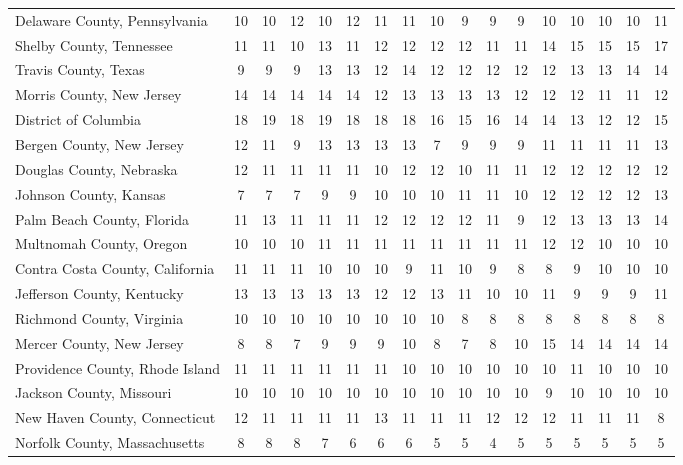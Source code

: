 \begin{landscape}
\begin{longtable}{lcccccccccccccccc}
Delaware County, Pennsylvania & 10 & 10 & 12 & 10 & 12 & 11 & 11 & 10 & 9 & 9 & 9 & 10 & 10 & 10 & 10 & 11 \\
Shelby County, Tennessee & 11 & 11 & 10 & 13 & 11 & 12 & 12 & 12 & 12 & 11 & 11 & 14 & 15 & 15 & 15 & 17 \\
Travis County, Texas & 9 & 9 & 9 & 13 & 13 & 12 & 14 & 12 & 12 & 12 & 12 & 12 & 13 & 13 & 14 & 14 \\
Morris County, New Jersey & 14 & 14 & 14 & 14 & 14 & 12 & 13 & 13 & 13 & 13 & 12 & 12 & 12 & 11 & 11 & 12 \\
District of Columbia & 18 & 19 & 18 & 19 & 18 & 18 & 18 & 16 & 15 & 16 & 14 & 14 & 13 & 12 & 12 & 15 \\
Bergen County, New Jersey & 12 & 11 & 9 & 13 & 13 & 13 & 13 & 7 & 9 & 9 & 9 & 11 & 11 & 11 & 11 & 13 \\
Douglas County, Nebraska & 12 & 11 & 11 & 11 & 11 & 10 & 12 & 12 & 10 & 11 & 11 & 12 & 12 & 12 & 12 & 12 \\
Johnson County, Kansas & 7 & 7 & 7 & 9 & 9 & 10 & 10 & 10 & 11 & 11 & 10 & 12 & 12 & 12 & 12 & 13 \\
Palm Beach County, Florida & 11 & 13 & 11 & 11 & 11 & 12 & 12 & 12 & 12 & 11 & 9 & 12 & 13 & 13 & 13 & 14 \\
Multnomah County, Oregon & 10 & 10 & 10 & 11 & 11 & 11 & 11 & 11 & 11 & 11 & 11 & 12 & 12 & 10 & 10 & 10 \\
Contra Costa County, California & 11 & 11 & 11 & 10 & 10 & 10 & 9 & 11 & 10 & 9 & 8 & 8 & 9 & 10 & 10 & 10 \\
Jefferson County, Kentucky & 13 & 13 & 13 & 13 & 13 & 12 & 12 & 13 & 11 & 10 & 10 & 11 & 9 & 9 & 9 & 11 \\
Richmond County, Virginia & 10 & 10 & 10 & 10 & 10 & 10 & 10 & 10 & 8 & 8 & 8 & 8 & 8 & 8 & 8 & 8 \\
Mercer County, New Jersey & 8 & 8 & 7 & 9 & 9 & 9 & 10 & 8 & 7 & 8 & 10 & 15 & 14 & 14 & 14 & 14 \\
Providence County, Rhode Island & 11 & 11 & 11 & 11 & 11 & 11 & 10 & 10 & 10 & 10 & 10 & 10 & 11 & 10 & 10 & 10 \\
Jackson County, Missouri & 10 & 10 & 10 & 10 & 10 & 10 & 10 & 10 & 10 & 10 & 10 & 9 & 10 & 10 & 10 & 10 \\
New Haven County, Connecticut & 12 & 11 & 11 & 11 & 11 & 13 & 11 & 11 & 11 & 12 & 12 & 12 & 11 & 11 & 11 & 8 \\
Norfolk County, Massachusetts & 8 & 8 & 8 & 7 & 6 & 6 & 6 & 5 & 5 & 4 & 5 & 5 & 5 & 5 & 5 & 5 \\

\end{longtable}
\end{landscape}
